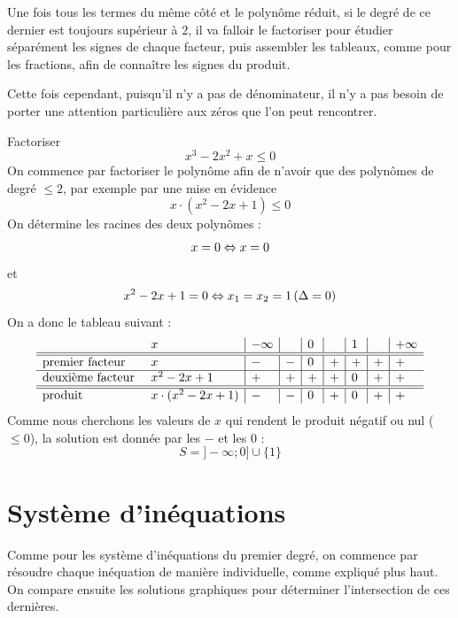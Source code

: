 Une fois tous les termes du même côté et le polynôme réduit, si le degré de ce dernier est toujours supérieur à $2$, il va falloir le factoriser pour étudier séparément les signes de chaque facteur, puis assembler les tableaux, comme pour les fractions, afin de connaître les signes du produit.

Cette fois cependant, puisqu'il n'y a pas de dénominateur, il n'y a pas besoin de porter une attention particulière aux zéros que l'on peut rencontrer.

\begin{exemple}
Factoriser 
$$
x^3 -2x^2 + x \leq 0
$$
On commence par factoriser le polynôme  afin de n'avoir que des polynômes de degré $\leq 2$, par exemple par une mise en évidence
$$
x\cdot (x^2 - 2x + 1) \leq 0
$$
On détermine les racines des deux polynômes :
$$
x = 0 \Leftrightarrow x = 0
$$
et 
$$
x^2 -2x + 1 = 0 \Leftrightarrow x_1 = x_2 = 1 \, (\Delta = 0)
$$
On a donc le tableau suivant :
$$
\begin{array}{l l|l|l|l|l|l|l|l}
&x& -\infty & & 0 & & 1 & & +\infty\\
\hline
\hline
\mbox{premier facteur }&x & - & - & 0 & + & + & + & +\\
\hline
\mbox{deuxième facteur }&x^2 - 2x + 1 &+ & + & + & + & 0 & + & + \\
\hline 
\hline
\mbox{produit }&x\cdot(x^2 -2x+1) & - & - & 0 & + & 0 & + & + \\
\end{array}
$$
Comme nous cherchons les valeurs de $x$ qui rendent le produit négatif ou nul ($\leq 0$), la solution est donnée par les $-$ et les $0$ :
$$
S=]-\infty;0] \cup \{1\}
$$
\end{exemple}

\section{Système d'inéquations}

Comme pour les système d'inéquations du premier degré, on commence par résoudre chaque inéquation de manière individuelle, comme expliqué plus haut. On compare ensuite les solutions graphiques pour déterminer l'intersection de ces dernières.

